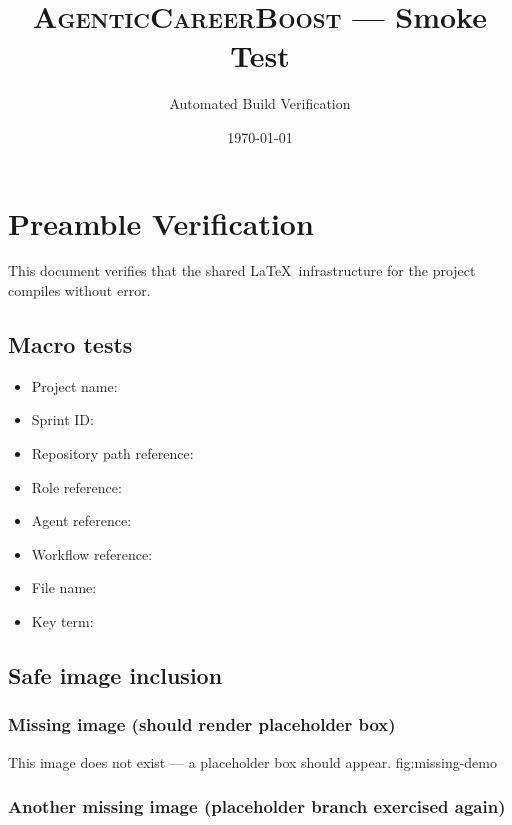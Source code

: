 \documentclass[a4paper,11pt]{report}
\title{\textsc{AgenticCareerBoost} --- Smoke Test}
\author{Automated Build Verification}
\date{\today}
\begin{document}
\maketitle

\chapter{Preamble Verification}


This document verifies that the shared \LaTeX\ infrastructure for the
\projectName{} project compiles without error.

\section{Macro tests}

\begin{itemize}
  \item Project name: \projectName{}
  \item Sprint ID: \sprintId{}
  \item Repository path reference: 
  \item Role reference: 
  \item Agent reference: 
  \item Workflow reference: 
  \item File name: 
  \item Key term: 
\end{itemize}

\section{Safe image inclusion}

\subsection{Missing image (should render placeholder box)}

%
  {This image does not exist --- a placeholder box should appear.}%
  {fig:missing-demo}

\subsection{Another missing image (placeholder branch exercised again)}
\end{document}
